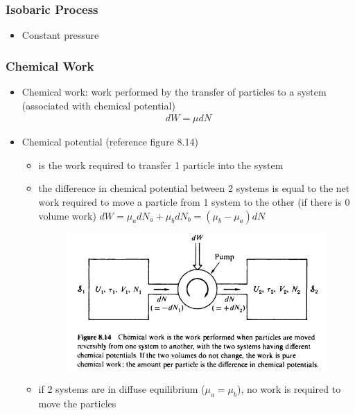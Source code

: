 \subsubsection{Isobaric Process}
\begin{itemize}
	\item Constant pressure 
\end{itemize}

\subsubsection{Chemical Work}
\begin{itemize}
    \item Chemical work: work performed by the transfer of particles to a system (associated with
    chemical potential)
    \begin{align}
        dW = \mu dN
    \end{align}
    \item Chemical potential (reference figure 8.14)
    \begin{itemize}
        \item is the work required to transfer 1 particle into the system
        \item the difference in chemical potential between 2 systems is equal to the net work
        required to move a particle from 1 system to the other (if there is 0 volume work)
        $dW = \mu_a dN_a + \mu_b dN_b = (\mu_b - \mu_a)dN$
        \begin{figure}[h]
            \centering
            \includegraphics[width=.75\textwidth]{Figures/chemical_work.png}
            \label{fig:chemical_work}
        \end{figure}
        \item if 2 systems are in diffuse equilibrium ($\mu_a = \mu_b$), no work is required to move
        the particles
    \end{itemize}
\end{itemize}



